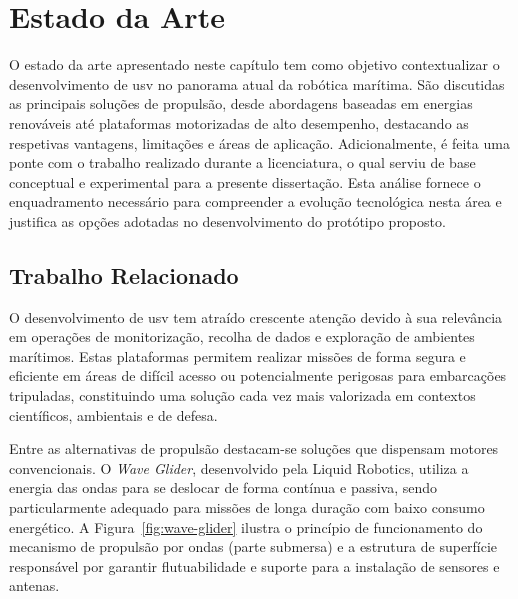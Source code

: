 
\chapter{Estado da Arte} \label{ch:estadodaarte}

O estado da arte apresentado neste capítulo tem como objetivo contextualizar o desenvolvimento de \gls{usv} no panorama atual da robótica marítima. São discutidas as principais soluções de propulsão, desde abordagens baseadas em energias renováveis até plataformas motorizadas de alto desempenho, destacando as respetivas vantagens, limitações e áreas de aplicação. Adicionalmente, é feita uma ponte com o trabalho realizado durante a licenciatura, o qual serviu de base conceptual e experimental para a presente dissertação. Esta análise fornece o enquadramento necessário para compreender a evolução tecnológica nesta área e justifica as opções adotadas no desenvolvimento do protótipo proposto.

\section{Trabalho Relacionado} 
\label{sec:trabalhorelacionado}

O desenvolvimento de \gls{usv} tem atraído crescente atenção devido à sua relevância em operações de monitorização, recolha de dados e exploração de ambientes marítimos. Estas plataformas permitem realizar missões de forma segura e eficiente em áreas de difícil acesso ou potencialmente perigosas para embarcações tripuladas, constituindo uma solução cada vez mais valorizada em contextos científicos, ambientais e de defesa.  

Entre as alternativas de propulsão destacam-se soluções que dispensam motores convencionais. O \emph{Wave Glider}, desenvolvido pela Liquid Robotics, utiliza a energia das ondas para se deslocar de forma contínua e passiva, sendo particularmente adequado para missões de longa duração com baixo consumo energético. A Figura~\ref{fig:wave-glider} ilustra o princípio de funcionamento do mecanismo de propulsão por ondas (parte submersa) e a estrutura de superfície responsável por garantir flutuabilidade e suporte para a instalação de sensores e antenas.

